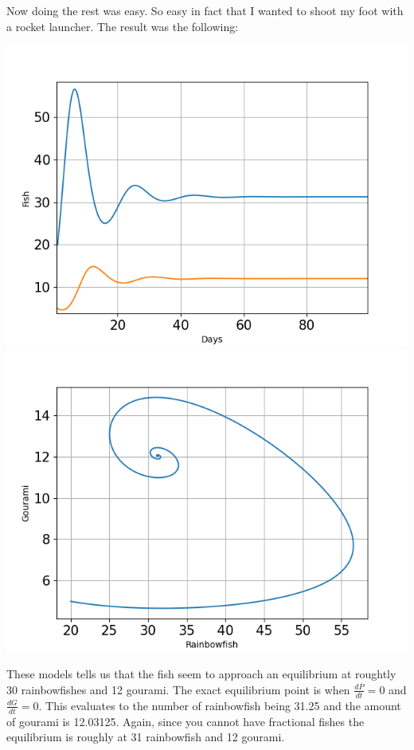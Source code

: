 \begin{flushleft}
    Now doing the rest was easy. So easy in fact that I wanted to shoot my foot
    with a rocket launcher. The result was the following:

\end{flushleft}
\begin{center}
    \includegraphics[scale=0.45]{../figures/Figure_2.png}
    \includegraphics[scale=0.45]{../figures/Figure_3.png}

\end{center}

\begin{flushleft}
    These models tells us that the fish seem to approach an equilibrium at roughtly
    30 rainbowfishes and 12 gourami. The exact equilibrium point is when $\frac{dP}{dt}=0$ and $\frac{dG}{dt}=0$.
    This evaluates to the number of rainbowfish being 31.25 and the amount of gourami is 12.03125. Again, since you
    cannot have fractional fishes the equilibrium is roughly at 31 rainbowfish and 12 gourami.

\end{flushleft}


